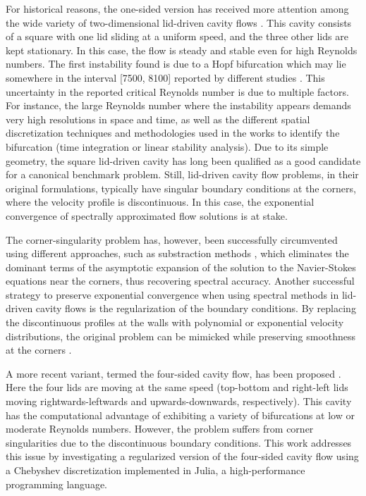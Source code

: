 For historical reasons, the one-sided version has received more attention among
the wide variety of two-dimensional lid-driven cavity flows
\citep{kuhlmann2019}. This cavity consists of a square with one lid sliding at
a uniform speed, and the three other lids are kept stationary. In this case,
the flow is steady and stable even for high Reynolds numbers. The first
instability found is due to a Hopf bifurcation which may lie somewhere in the
interval [7500, 8100] reported by different studies \citep{kuhlmann2019}. This
uncertainty in the reported critical Reynolds number is due to multiple
factors. For instance,  the large Reynolds number where the instability appears
demands very high resolutions in space and time, as well as the different
spatial discretization techniques and methodologies used in the works to
identify the bifurcation (time integration or linear stability analysis). Due
to its simple geometry, the square lid-driven cavity has long been qualified as
a good candidate for a canonical benchmark problem. Still, lid-driven cavity
flow problems, in their original formulations, typically have singular boundary
conditions at the corners, where the velocity profile is discontinuous. In this
case, the exponential convergence of spectrally approximated flow solutions is
at stake. 

The corner-singularity problem has, however, been successfully circumvented
using different approaches, such as substraction methods \citep{botella1998},
which eliminates the dominant terms of the asymptotic expansion of the solution
to the Navier-Stokes equations near the corners, thus recovering spectral
accuracy. Another successful strategy to preserve exponential convergence when
using spectral methods in lid-driven cavity flows is the regularization of the
boundary conditions. By replacing the discontinuous profiles at the walls with
polynomial or exponential velocity distributions, the original problem can be
mimicked while preserving smoothness at the corners \citep{shen1991,
lopez2017}.

A more recent variant, termed the four-sided cavity flow, has been proposed
\citep{wahba2009}. Here the four lids are moving at the same speed (top-bottom
and right-left lids moving rightwards-leftwards and upwards-downwards,
respectively). This cavity has the computational advantage of exhibiting a
variety of bifurcations at low or moderate Reynolds numbers. However, the
problem suffers from corner singularities due to the discontinuous boundary
conditions. This work addresses this issue by investigating a regularized
version of the four-sided cavity flow using a Chebyshev discretization
implemented in Julia, a high-performance programming language.

